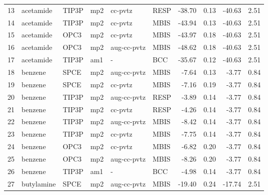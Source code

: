 \begin{tabular}{llllllrrrr}
13  &                      acetamide &      TIP3P &      mp2 &      cc-pvtz &         RESP & -38.70 &      0.13 &      -40.63 &     2.51 \\
14  &                      acetamide &      TIP3P &      mp2 &      cc-pvtz &         MBIS & -43.94 &      0.13 &      -40.63 &     2.51 \\
15  &                      acetamide &       OPC3 &      mp2 &      cc-pvtz &         MBIS & -43.97 &      0.18 &      -40.63 &     2.51 \\
16  &                      acetamide &       OPC3 &      mp2 &  aug-cc-pvtz &         MBIS & -48.62 &      0.18 &      -40.63 &     2.51 \\
17  &                      acetamide &      TIP3P &      am1 &            - &          BCC & -35.67 &      0.12 &      -40.63 &     2.51 \\
18  &                        benzene &       SPCE &      mp2 &  aug-cc-pvtz &         MBIS &  -7.64 &      0.13 &       -3.77 &     0.84 \\
19  &                        benzene &       SPCE &      mp2 &      cc-pvtz &         MBIS &  -7.16 &      0.19 &       -3.77 &     0.84 \\
20  &                        benzene &      TIP3P &      mp2 &  aug-cc-pvtz &         RESP &  -3.89 &      0.14 &       -3.77 &     0.84 \\
21  &                        benzene &      TIP3P &      mp2 &      cc-pvtz &         RESP &  -4.26 &      0.14 &       -3.77 &     0.84 \\
22  &                        benzene &      TIP3P &      mp2 &  aug-cc-pvtz &         MBIS &  -8.42 &      0.14 &       -3.77 &     0.84 \\
23  &                        benzene &      TIP3P &      mp2 &      cc-pvtz &         MBIS &  -7.75 &      0.14 &       -3.77 &     0.84 \\
24  &                        benzene &       OPC3 &      mp2 &      cc-pvtz &         MBIS &  -6.82 &      0.20 &       -3.77 &     0.84 \\
25  &                        benzene &       OPC3 &      mp2 &  aug-cc-pvtz &         MBIS &  -8.26 &      0.20 &       -3.77 &     0.84 \\
26  &                        benzene &      TIP3P &      am1 &            - &          BCC &  -4.98 &      0.14 &       -3.77 &     0.84 \\
27  &                     butylamine &       SPCE &      mp2 &  aug-cc-pvtz &         MBIS & -19.40 &      0.24 &      -17.74 &     2.51 \\

\end{tabular}
